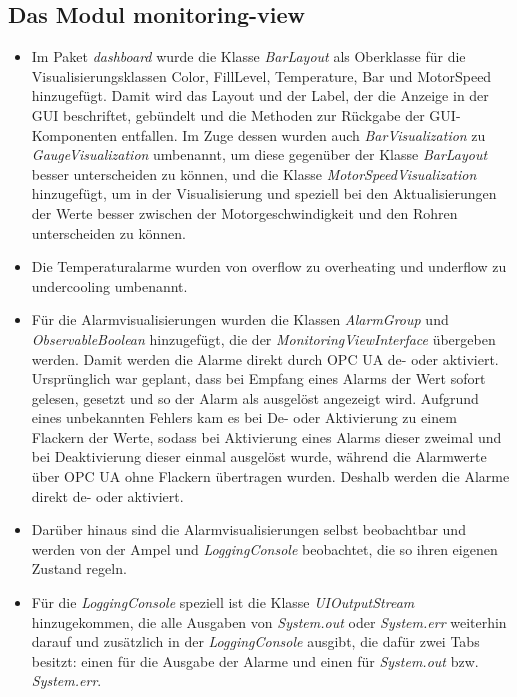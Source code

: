 \documentclass[parskip=full]{scrartcl}
\begin{document}
\subsection{Das Modul monitoring-view}
\begin{itemize}
 \item Im Paket \emph{dashboard} wurde die Klasse \emph{BarLayout} als Oberklasse für die Visualisierungsklassen Color, FillLevel, Temperature, Bar und MotorSpeed hinzugefügt. Damit wird das Layout und der Label, der die Anzeige in der GUI beschriftet, gebündelt und die Methoden zur Rückgabe der GUI-Komponenten entfallen. Im Zuge dessen wurden auch \emph{BarVisualization} zu \emph{GaugeVisualization} umbenannt, um diese gegenüber der Klasse \emph{BarLayout} besser unterscheiden zu können, und die Klasse \emph{MotorSpeedVisualization} hinzugefügt, um in der Visualisierung und speziell bei den Aktualisierungen der Werte besser zwischen der Motorgeschwindigkeit und den Rohren unterscheiden zu können.
 \item Die Temperaturalarme wurden von overflow zu overheating und underflow zu undercooling umbenannt.
 \item Für die Alarmvisualisierungen wurden die Klassen \emph{AlarmGroup} und \emph{ObservableBoolean} hinzugefügt, die der \emph{MonitoringViewInterface} übergeben werden. Damit werden die Alarme direkt durch OPC UA de- oder aktiviert. Ursprünglich war geplant, dass bei Empfang eines Alarms der Wert sofort gelesen, gesetzt und so der Alarm als ausgelöst angezeigt wird. Aufgrund eines unbekannten Fehlers kam es bei De- oder Aktivierung zu einem Flackern der Werte, sodass bei Aktivierung eines Alarms dieser zweimal und bei Deaktivierung dieser einmal ausgelöst wurde, während die Alarmwerte über OPC UA ohne Flackern übertragen wurden. Deshalb werden die Alarme direkt de- oder aktiviert.
 \item Darüber hinaus sind die Alarmvisualisierungen selbst beobachtbar und werden von der Ampel und \emph{LoggingConsole} beobachtet, die so ihren eigenen Zustand regeln.
 \item Für die \emph{LoggingConsole} speziell ist die Klasse \emph{UIOutputStream} hinzugekommen, die alle Ausgaben von \emph{System.out} oder \emph{System.err} weiterhin darauf und zusätzlich in der \emph{LoggingConsole} ausgibt, die dafür zwei Tabs besitzt: einen für die Ausgabe der Alarme und einen für \emph{System.out} bzw. \emph{System.err}.
\end{itemize}
\end{document}

